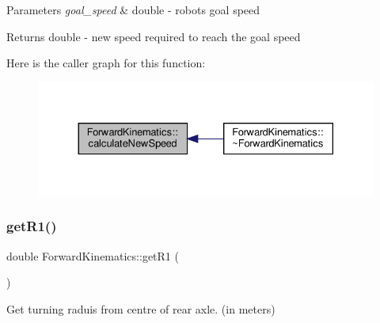 \begin{DoxyParams}{Parameters}
{\em goal\+\_\+speed} & double -\/ robot\textquotesingle{}s goal speed \\
\hline
\end{DoxyParams}
\begin{DoxyReturn}{Returns}
double -\/ new speed required to reach the goal speed 
\end{DoxyReturn}
Here is the caller graph for this function\+:
\nopagebreak
\begin{figure}[H]
\begin{center}
\leavevmode
\includegraphics[width=330pt]{classForwardKinematics_af945b5d3d508aba54ea902674a65373c_icgraph}
\end{center}
\end{figure}
\mbox{\label{classForwardKinematics_a6fdaaf30015b1628efed2407ea13c780}} 
\subsubsection{\texorpdfstring{get\+R1()}{getR1()}}
{\footnotesize\ttfamily double Forward\+Kinematics\+::get\+R1 (\begin{DoxyParamCaption}{ }\end{DoxyParamCaption})}



Get turning raduis from centre of rear axle. (in meters) 


